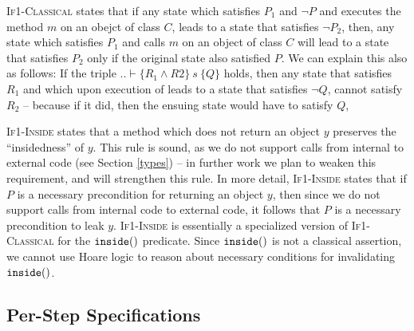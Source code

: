  

 \textsc{If1-Classical} states that  
if any state which satisfies $P_1$ and $\neg P$ and executes  the method $m$ on an obejct of class $C$, leads to a state that satisfies $\neg P_2$, then, any state which satisfies $P_1$ and calls $m$ on an object of class $C$ will lead to a state that satisfies $P_2$ only if the original state also satisfied $P$.
We can explain this also as follows: If the triple $.. \vdash \{R_1 \wedge R2\}\ s\ \{Q\}$ holds, then any state that satisfies $R_1$ and which upon execution of  leads to a state that satisfies $\neg Q$, cannot satisfy $R_2$ -- because  if it did, then the ensuing state would have to satisfy $Q$,
 


 
\textsc{If1-Inside} states that a method which does not return an object $y$ 
preserves the ``insidedness'' of $y$. 
This rule is sound, as we do not support calls from internal to external code (see Section \ref{types})
-- in further work we plan to weaken this requirement, and will  
strengthen this rule.
In more detail,  \textsc{If1-Inside}   states that if $P$ is
a necessary precondition for returning an object $y$, then  
since we do not support calls from internal code to external code,
it follows that $P$ is a necessary precondition to leak $y$.
\textsc{If1-Inside}  is essentially  a specialized version of \textsc{If1-Classical}
for the $\texttt{inside}(  )$ predicate. Since $\texttt{inside}(  )$ is not a classical
assertion, we cannot use Hoare logic to reason about necessary conditions
for invalidating $\texttt{inside}(  )$.
 
 
 

\subsection{Per-Step \Nec Specifications}
\label{s:module-proof}

